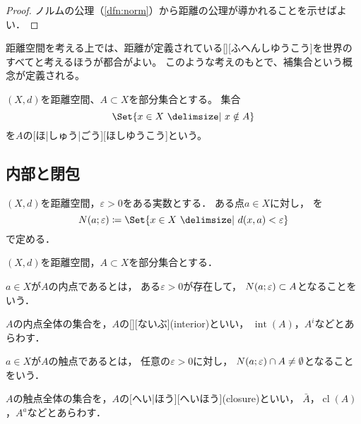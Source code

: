 \documentclass[../sotsu.tex]{subfiles}
\begin{document}
\begin{proof}
    ノルムの公理（\cref{dfn:norm}）から距離の公理が導かれることを示せばよい．
\end{proof}

距離空間を考える上では、距離が定義されている[][ふへんしゆうこう]を世界のすべてと考えるほうが都合がよい。
このような考えのもとで、補集合という概念が定義される。

\begin{definition}
    $(X, d)$を距離空間、$A \subset X$を部分集合とする。
    集合
    \begin{equation*}
        \Set{  x \in X  \given  x \notin A  }
    \end{equation*}
    を$A$の[ほ|しゅう|ごう][ほしゆうこう]という。
\end{definition}




\subsection{内部と閉包}


\begin{definition}
    $(X, d)$を距離空間，$\varepsilon > 0$をある実数とする．
    ある点$a \in X$に対し，%
    を
    \begin{equation}
        \neigh(a; \varepsilon) \coloneq \Set{  x \in X  \given  d(x, a) < \varepsilon  }
    \end{equation}
    で定める．
\end{definition}

$(X, d)$を距離空間，$A \subset X$を部分集合とする．

\begin{definition}
    \label{dfn:interior}
    $a \in X$が$A$の内点であるとは，
    ある$\varepsilon > 0$が存在して，
    $N(a; \varepsilon) \subset A$となることをいう．

    $A$の内点全体の集合を，$A$の[][ないぶ](interior)といい，
    $\operatorname{int}(A)$，$A^i$などとあらわす．
\end{definition}

\begin{definition}
    \label{dfn:closure}
    $a \in X$が$A$の触点であるとは，
    任意の$\varepsilon > 0$に対し，
    $N(a; \varepsilon) \cap A \neq \emptyset$となることをいう．

    $A$の触点全体の集合を，$A$の[へい|ほう][へいほう](closure)といい，
    $\bar{A}$，$\operatorname{cl}(A)$，$A^a$などとあらわす．
\end{definition}
\end{document}
